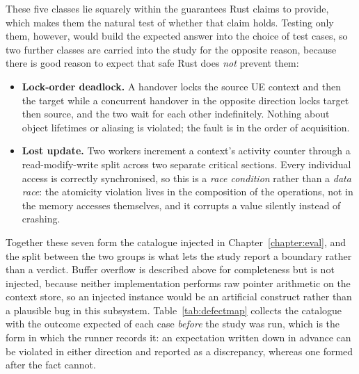 \documentclass[english,twoside,openright,a4paper,censored,csm,software-track-2020]{HYthesisML}
\begin{document}
These five classes lie squarely within the guarantees Rust claims to provide, which makes them
the natural test of whether that claim holds. Testing only them, however, would build the
expected answer into the choice of test cases, so two further classes are carried into the
study for the opposite reason, because there is good reason to expect that safe Rust does
\emph{not} prevent them:

\begin{itemize}
  \item \textbf{Lock-order deadlock.} A handover locks the source UE context and then the
        target while a concurrent handover in the opposite direction locks target then source,
        and the two wait for each other indefinitely. Nothing about object lifetimes or
        aliasing is violated; the fault is in the order of acquisition.
  \item \textbf{Lost update.} Two workers increment a context's activity counter through a
        read-modify-write split across two separate critical sections. Every individual access
        is correctly synchronised, so this is a \emph{race condition} rather than a
        \emph{data race}: the atomicity violation lives in the composition of the operations,
        not in the memory accesses themselves, and it corrupts a value silently instead of
        crashing.
\end{itemize}

Together these seven form the catalogue injected in Chapter~\ref{chapter:eval}, and the split
between the two groups is what lets the study report a boundary rather than a verdict. Buffer
overflow is described above for completeness but is not injected, because neither
implementation performs raw pointer arithmetic on the context store, so an injected instance
would be an artificial construct rather than a plausible bug in this subsystem.
Table~\ref{tab:defectmap} collects the catalogue with the outcome expected of each case
\emph{before} the study was run, which is the form in which the runner records it: an
expectation written down in advance can be violated in either direction and reported as a
discrepancy, whereas one formed after the fact cannot.
\end{document}
